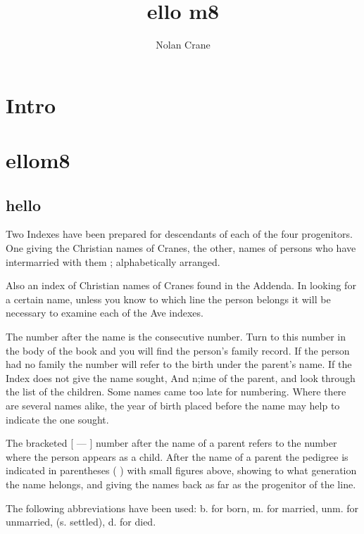 \documentclass{book}
\begin{document}
\title{ello m8}
\author{Nolan Crane}

\maketitle
\tableofcontents

\chapter{Intro}

\chapter{ellom8}


\section{hello}


Two Indexes have been prepared for descendants of each of the 
four progenitors. One giving the Christian names of Cranes, the other, 
names of persons who have intermarried with them ; alphabetically 
arranged. 

Also an index of Christian names of Cranes found in the Addenda. 
In looking for a certain name, unless you know to which line the 
person belongs it will be necessary to examine each of the Ave indexes. 

The number after the name is the consecutive number. Turn to this 
number in the body of the book and you will find the person's family 
record. If the person had no family the number will refer to the birth 
under the parent's name. If the Index does not give the name sought, 
And n;ime of the parent, and look through the list of the children. 
Some names came too late for numbering. Where there are several 
names alike, the year of birth placed before the name may help to 
indicate the one sought. 

The bracketed [ — ] number after the name of a parent refers to the 
number where the person appears as a child. After the name of a parent the pedigree is indicated in parentheses ( ) with small figures above, showing to what generation the name helongs, and giving the names back as far as the progenitor of the line. 

The following abbreviations have been used: b. for born, m. for 
married, unm. for unmarried, (s. settled), d. for died. 
\end{document}

